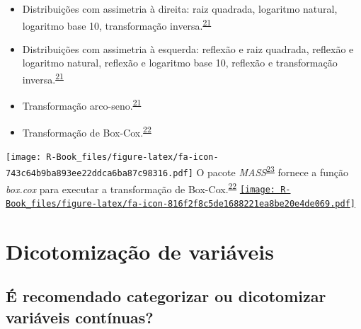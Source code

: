 \documentclass[
]{book}
\begin{document}
\begin{itemize}
\item
  Distribuições com assimetria à direita: raiz quadrada, logaritmo natural, logaritmo base 10, transformação inversa.\textsuperscript{\protect\hyperlink{ref-osborne2010}{21}}
\item
  Distribuições com assimetria à esquerda: reflexão e raiz quadrada, reflexão e logaritmo natural, reflexão e logaritmo base 10, reflexão e transformação inversa.\textsuperscript{\protect\hyperlink{ref-osborne2010}{21}}
\item
  Transformação arco-seno.\textsuperscript{\protect\hyperlink{ref-osborne2010}{21}}
\item
  Transformação de Box-Cox.\textsuperscript{\protect\hyperlink{ref-box1964}{22}}
\end{itemize}

\texttt{[image: R-Book\_files/figure-latex/fa-icon-743c64b9ba893ee22ddca6ba87c98316.pdf]} O pacote \emph{MASS}\textsuperscript{\protect\hyperlink{ref-MASS}{23}} fornece a função \emph{box.cox} para executar a transformação de Box-Cox.\textsuperscript{\protect\hyperlink{ref-box1964}{22}} \href{https://cran.r-project.org/web/packages/MASS/index.html}{\texttt{[image: R-Book\_files/figure-latex/fa-icon-816f2f8c5de1688221ea8be20e4de069.pdf]}}

\hypertarget{dicotomizacao}{%
\section{Dicotomização de variáveis}\label{dicotomizacao}}

\hypertarget{uxe9-recomendado-categorizar-ou-dicotomizar-variuxe1veis-contuxednuas}{%
\subsection{É recomendado categorizar ou dicotomizar variáveis contínuas?}\label{uxe9-recomendado-categorizar-ou-dicotomizar-variuxe1veis-contuxednuas}}
\end{document}
